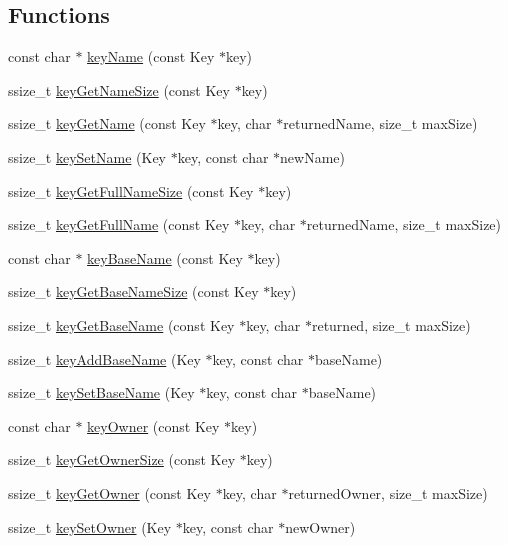 \subsection*{Functions}
\begin{DoxyCompactItemize}
\item 
const char $\ast$ \hyperlink{group__keyname_ga8e805c726a60da921d3736cda7813513}{key\-Name} (const Key $\ast$key)
\item 
ssize\-\_\-t \hyperlink{group__keyname_gabdbcfa51ed8a387e47ead207affa2d2e}{key\-Get\-Name\-Size} (const Key $\ast$key)
\item 
ssize\-\_\-t \hyperlink{group__keyname_gab29a850168d9b31c9529e90cf9ab68be}{key\-Get\-Name} (const Key $\ast$key, char $\ast$returned\-Name, size\-\_\-t max\-Size)
\item 
ssize\-\_\-t \hyperlink{group__keyname_ga7699091610e7f3f43d2949514a4b35d9}{key\-Set\-Name} (Key $\ast$key, const char $\ast$new\-Name)
\item 
ssize\-\_\-t \hyperlink{group__keyname_gab65dc9d43d3ee08d5e936a20ebbddd23}{key\-Get\-Full\-Name\-Size} (const Key $\ast$key)
\item 
ssize\-\_\-t \hyperlink{group__keyname_gaaba1494a5ffc976e0e56c43f4334a23c}{key\-Get\-Full\-Name} (const Key $\ast$key, char $\ast$returned\-Name, size\-\_\-t max\-Size)
\item 
const char $\ast$ \hyperlink{group__keyname_gaaff35e7ca8af5560c47e662ceb9465f5}{key\-Base\-Name} (const Key $\ast$key)
\item 
ssize\-\_\-t \hyperlink{group__keyname_ga1a0b76c5d9e5367c7e72211e6c63d43a}{key\-Get\-Base\-Name\-Size} (const Key $\ast$key)
\item 
ssize\-\_\-t \hyperlink{group__keyname_ga0992d26bcfca767cb8e77053a483eb64}{key\-Get\-Base\-Name} (const Key $\ast$key, char $\ast$returned, size\-\_\-t max\-Size)
\item 
ssize\-\_\-t \hyperlink{group__keyname_gaa942091fc4bd5c2699e49ddc50829524}{key\-Add\-Base\-Name} (Key $\ast$key, const char $\ast$base\-Name)
\item 
ssize\-\_\-t \hyperlink{group__keyname_ga6e804bd453f98c28b0ff51430d1df407}{key\-Set\-Base\-Name} (Key $\ast$key, const char $\ast$base\-Name)
\item 
const char $\ast$ \hyperlink{group__keyname_gaf6485fb8599714b6bbd830cf915ffea5}{key\-Owner} (const Key $\ast$key)
\item 
ssize\-\_\-t \hyperlink{group__keyname_ga4a4561895741ba2ad10acf007c188593}{key\-Get\-Owner\-Size} (const Key $\ast$key)
\item 
ssize\-\_\-t \hyperlink{group__keyname_ga35922a017bee8b4bcb493bbdfad9d6f5}{key\-Get\-Owner} (const Key $\ast$key, char $\ast$returned\-Owner, size\-\_\-t max\-Size)
\item 
ssize\-\_\-t \hyperlink{group__keyname_ga88d6ec200ba0707b7c1b4a88133d2be4}{key\-Set\-Owner} (Key $\ast$key, const char $\ast$new\-Owner)
\end{DoxyCompactItemize}


